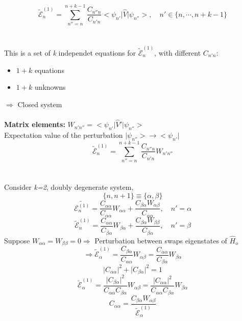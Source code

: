 \documentclass[12pt,fancychapters]{report}
\numberwithin{equation}{section}
\begin{document}
\[
  \boxed{\tilde{\mathcal{E}}_n^{(1)} = \sum_{n''=n}^{n+k-1} \frac{C_{n''n}}{C_{n'n}} 
  \big<\psi_{n'}\big|\hat{V}\big|\psi_{n''} \big>}, \quad n' \in \{n, \cdots, n+k-1\}
\]\\
\\
This is a set of \emph{k} independet equations for $\tilde{\mathcal{E}}_n^{(1)}$, with 
different $C_{n'n}$:
\begin{itemize}
  \item $1+k$ equations
  \item $1 +k$ unknowns 
\end{itemize}
$\Rightarrow$ Closed system
\\
\\
\textbf{Matrix elements:} $W_{n'n''} = \big<\psi_{n'}\big|\hat{V}'\big|\psi_{n''} \big>$
\\
Expectation value of the perturbation $\big|\psi_{n''}\big>\longrightarrow \big<\psi_{n'}\big|$
\[
  \tilde{\mathcal{E}}_n^{(1)} = \sum_{n''=n}^{n+k-1} \frac{C_{n''n}}{C_{n'n}}W_{n'n''}
\]\\
\\
Consider \emph{k=2}, doubly degenerate system, 
$$\{n, n+1\} \equiv \{\alpha, \beta\}$$
\begin{equation*}
  \tilde{\mathcal{E}_n^{(1)}} = \frac{C_{\alpha \alpha}}{C_{\alpha \alpha}} W_{\alpha \alpha} +
  \frac{C_{\beta \alpha}W_{\alpha \beta}}{C_{\alpha \alpha}}, \quad n' = \alpha
\end{equation*}
\begin{equation*}
  \tilde{\mathcal{E}}_n^{(1)} = \frac{C_{\alpha \alpha}}{C_{\beta \alpha}} W_{\beta \alpha} + 
  \frac{C_{\beta \alpha} W_{\beta \beta}}{C_{\beta \alpha}},\quad  n' = \beta
\end{equation*}
Suppose $W_{\alpha\alpha} = W_{\beta\beta} = 0 \Rightarrow$ Perturbation between swaps eigenstates
of $\hat{H}_o$
\begin{equation*}
  \Rightarrow \tilde{\mathcal{E}}_{\alpha}^{(1)} = \frac{C_{\beta\alpha}}{C_{\alpha\alpha}}
  W_{\alpha\beta} = \frac{C_{\alpha\alpha}}{C_{\beta\alpha}}W_{\beta\alpha}
\end{equation*}
\[
  \big|C_{\alpha\alpha}\big|^2+ \big|C_{\beta\alpha}\big|^2 = 1
\]
\begin{equation*}
  \tilde{\mathcal{E}}_\alpha^{(1)} = \frac{\big|C_{\beta\alpha}\big|^2}{C_{\alpha\alpha}C_
  {\beta\alpha}} W_{\alpha\beta} = \frac{\big|C_{\alpha\alpha}\big|^2}{C_{\alpha\alpha}
C_{\beta\alpha}}W_{\beta\alpha}
\end{equation*}
\[
  C_{\alpha\alpha} = \frac{C_{\beta\alpha}W_{\alpha\beta}}{\tilde{\mathcal{E}}_\alpha^{(1)}}
\]
\end{document}
